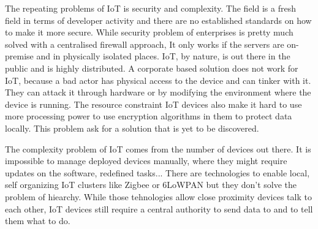 The repeating problems of IoT is security and complexity. The field is a fresh field in terms of developer activity and there are no established standards on how to make it more secure. While security problem of enterprises is pretty much solved with a centralised firewall approach, It only works if the servers are on-premise and in physically isolated places. IoT, by nature, is out there in the public and is highly distributed. A corporate based solution does not work for IoT, because a bad actor has physical access to the device and can tinker with it. They can attack it through hardware or by modifying the environment where the device is running. The resource constraint IoT devices also make it hard to use more processing power to use encryption algorithms in them to protect data locally. This problem ask for a solution that is yet to be discovered.

The complexity problem of IoT comes from the number of devices out there. It is impossible to manage deployed devices manually, where they might require updates on the software, redefined tasks... There are technologies to enable local, self organizing IoT clusters like Zigbee or 6LoWPAN but they don't solve the problem of hiearchy. While those tehnologies allow close proximity devices talk to each other, IoT devices still require a central authority to send data to and to tell them what to do.
